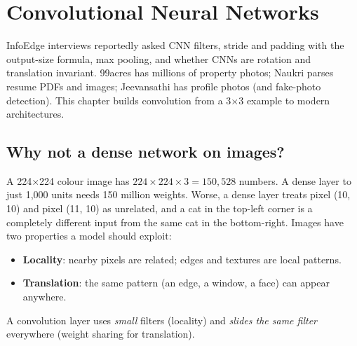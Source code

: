 \chapter{Convolutional Neural Networks}

InfoEdge interviews reportedly asked CNN filters, stride and padding with the output-size formula, max pooling, and whether CNNs are
rotation and translation invariant. 99acres has millions of property photos; Naukri parses resume PDFs and images; Jeevansathi has profile
photos (and fake-photo detection). This chapter builds convolution from a 3$\times$3 example to modern architectures.

\section{Why not a dense network on images?}
A 224$\times$224 colour image has $224\times224\times3 = 150{,}528$ numbers. A dense layer to just 1{,}000 units needs 150 million weights.
Worse, a dense layer treats pixel (10, 10) and pixel (11, 10) as unrelated, and a cat in the top-left corner is a completely different input
from the same cat in the bottom-right. Images have two properties a model should exploit:
\begin{itemize}
\item \textbf{Locality}: nearby pixels are related; edges and textures are local patterns.
\item \textbf{Translation}: the same pattern (an edge, a window, a face) can appear anywhere.
\end{itemize}
A convolution layer uses \emph{small} filters (locality) and \emph{slides the same filter} everywhere (weight sharing for translation).

